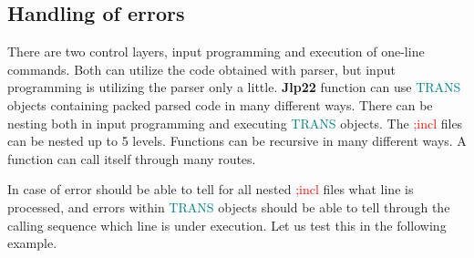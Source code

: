 \subsection{Handling of errors} 
\label{errorhand} 
There are two control layers, input programming and execution of one-line commands. Both can utilize 
the code obtained with parser, but input programming is utilizing the parser only a little. 
\textbf{Jlp22} function can use \textcolor{teal}{TRANS} objects containing packed parsed code in many different ways. 
There can be nesting both in input programming and executing \textcolor{teal}{TRANS} objects. The \textcolor{Red}{;incl} files 
can be nested up to 5 levels. Functions can be recursive in many different ways. A function can call itself 
through many routes. 
 
In case of error should be able to tell for all nested \textcolor{Red}{;incl} files what line is 
processed, and errors within \textcolor{teal}{TRANS} objects should be able to tell through the calling sequence 
which line is under execution. 
Let us test this in the following example. 
 
